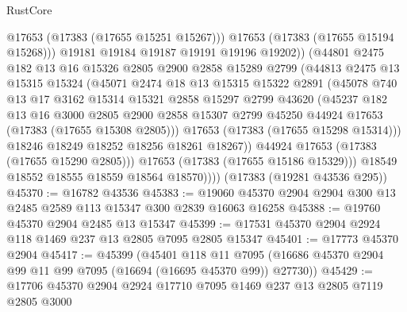 \begin{lexlean}{RustCore}
\begin{coremodule}
                      @17653
                      (@17383 (@17655 @15251 @15267)))
                    @17653
                    (@17383 (@17655 @15194 @15268)))
                  @19181
                  @19184
                  @19187
                  @19191
                  @19196
                  @19202))
              (@44801
                @2475
                @182
                @13
                @16
                @15326
                @2805
                @2900
                @2858
                @15289
                @2799
                (@44813
                  @2475
                  @13
                  @15315
                  @15324
                  (@45071
                    @2474
                    @18
                    @13
                    @15315
                    @15322
                    @2891
                    (@45078
                      @740
                      @13
                      @17
                      @3162
                      @15314
                      @15321
                      @2858
                      @15297
                      @2799
                      @43620
                      (@45237
                        @182
                        @13
                        @16
                        @3000
                        @2805
                        @2900
                        @2858
                        @15307
                        @2799
                        @45250
                        @44924
                        @17653
                        (@17383 (@17655 @15308 @2805)))
                      @17653
                      (@17383 (@17655 @15298 @15314)))
                    @18246
                    @18249
                    @18252
                    @18256
                    @18261
                    @18267))
                @44924
                @17653
                (@17383 (@17655 @15290 @2805)))
              @17653
              (@17383 (@17655 @15186 @15329)))
            @18549
            @18552
            @18555
            @18559
            @18564
            @18570))))
    (@17383 (@19281 @43536 @295))
@45370 := @16782 @43536
@45383 := @19060 @45370 @2904 @2904 @300 @13 @2485 @2589 @113 @15347 @300 @2839 @16063 @16258
@45388 := @19760 @45370 @2904 @2485 @13 @15347
@45399 := @17531 @45370 @2904 @2924 @118 @1469 @237 @13 @2805 @7095 @2805 @15347
@45401 := @17773 @45370 @2904
@45417 := @45399
    (@45401
      @118
      @11
      @7095
      (@16686 @45370 @2904 @99 @11 @99 @7095 (@16694 (@16695 @45370 @99)) @27730))
@45429 := @17706 @45370 @2904 @2924 @17710 @7095 @1469 @237 @13 @2805 @7119 @2805 @3000

\end{coremodule}
\end{lexlean}
